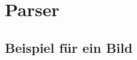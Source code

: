 \chapter{Parser}
\label{chap:chap2}

\lipsum[1]{}

\section{Beispiel für ein Bild}
\label{sec:objekthierarchie}

\lipsum[2]{}

\cite{Example}
